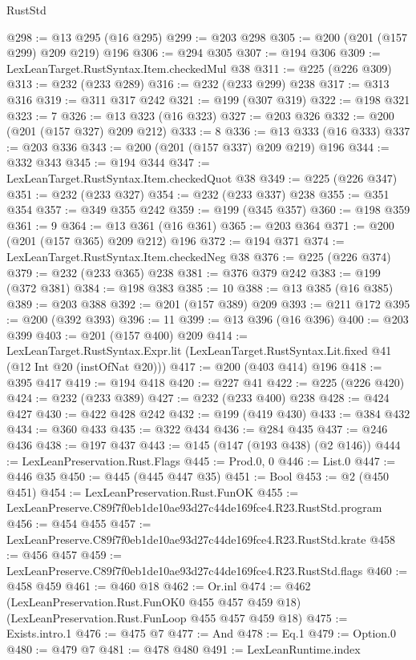 \begin{lexlean}{RustStd}
\begin{coremodule}
@298 := @13 @295 (@16 @295)
@299 := @203 @298
@305 := @200 (@201 (@157 @299) @209 @219) @196
@306 := @294 @305
@307 := @194 @306
@309 := LexLeanTarget.RustSyntax.Item.checkedMul @38
@311 := @225 (@226 @309)
@313 := @232 (@233 @289)
@316 := @232 (@233 @299) @238
@317 := @313 @316
@319 := @311 @317 @242
@321 := @199 (@307 @319)
@322 := @198 @321
@323 := 7
@326 := @13 @323 (@16 @323)
@327 := @203 @326
@332 := @200 (@201 (@157 @327) @209 @212)
@333 := 8
@336 := @13 @333 (@16 @333)
@337 := @203 @336
@343 := @200 (@201 (@157 @337) @209 @219) @196
@344 := @332 @343
@345 := @194 @344
@347 := LexLeanTarget.RustSyntax.Item.checkedQuot @38
@349 := @225 (@226 @347)
@351 := @232 (@233 @327)
@354 := @232 (@233 @337) @238
@355 := @351 @354
@357 := @349 @355 @242
@359 := @199 (@345 @357)
@360 := @198 @359
@361 := 9
@364 := @13 @361 (@16 @361)
@365 := @203 @364
@371 := @200 (@201 (@157 @365) @209 @212) @196
@372 := @194 @371
@374 := LexLeanTarget.RustSyntax.Item.checkedNeg @38
@376 := @225 (@226 @374)
@379 := @232 (@233 @365) @238
@381 := @376 @379 @242
@383 := @199 (@372 @381)
@384 := @198 @383
@385 := 10
@388 := @13 @385 (@16 @385)
@389 := @203 @388
@392 := @201 (@157 @389) @209
@393 := @211 @172
@395 := @200 (@392 @393)
@396 := 11
@399 := @13 @396 (@16 @396)
@400 := @203 @399
@403 := @201 (@157 @400) @209
@414 := LexLeanTarget.RustSyntax.Expr.lit
    (LexLeanTarget.RustSyntax.Lit.fixed @41 (@12 Int @20 (instOfNat @20)))
@417 := @200 (@403 @414) @196
@418 := @395 @417
@419 := @194 @418
@420 := @227 @41
@422 := @225 (@226 @420)
@424 := @232 (@233 @389)
@427 := @232 (@233 @400) @238
@428 := @424 @427
@430 := @422 @428 @242
@432 := @199 (@419 @430)
@433 := @384 @432
@434 := @360 @433
@435 := @322 @434
@436 := @284 @435
@437 := @246 @436
@438 := @197 @437
@443 := @145 (@147 (@193 @438) (@2 @146))
@444 := LexLeanPreservation.Rust.Flags
@445 := Prod.{0, 0}
@446 := List.{0}
@447 := @446 @35
@450 := @445 (@445 @447 @35)
@451 := Bool
@453 := @2 (@450 @451)
@454 := LexLeanPreservation.Rust.FunOK
@455 := LexLeanPreserve.C89f7f0eb1de10ae93d27c44de169fce4.R23.RustStd.program
@456 := @454 @455
@457 := LexLeanPreserve.C89f7f0eb1de10ae93d27c44de169fce4.R23.RustStd.krate
@458 := @456 @457
@459 := LexLeanPreserve.C89f7f0eb1de10ae93d27c44de169fce4.R23.RustStd.flags
@460 := @458 @459
@461 := @460 @18
@462 := Or.inl
@474 := @462
    (LexLeanPreservation.Rust.FunOK0 @455 @457 @459 @18)
    (LexLeanPreservation.Rust.FunLoop @455 @457 @459 @18)
@475 := Exists.intro.{1}
@476 := @475 @7
@477 := And
@478 := Eq.{1}
@479 := Option.{0}
@480 := @479 @7
@481 := @478 @480
@491 := LexLeanRuntime.index

\end{coremodule}
\end{lexlean}
